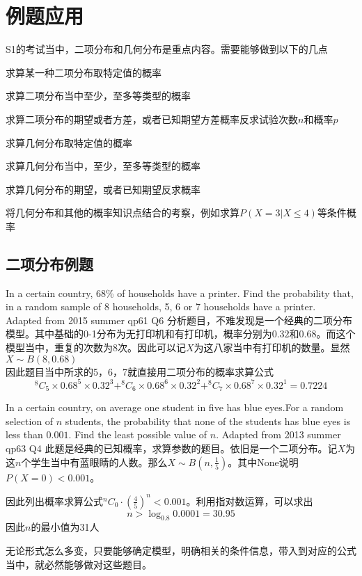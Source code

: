 \clearpage

\section{例题应用}
S1的考试当中，二项分布和几何分布是重点内容。需要能够做到以下的几点
\begin{todolist}
	\item 求算某一种二项分布取特定值的概率
	\item 求算二项分布当中至少，至多等类型的概率
	\item 求算二项分布的期望或者方差，或者已知期望方差概率反求试验次数$n$和概率$p$
	\item 求算几何分布取特定值的概率
	\item 求算几何分布当中，至少，至多等类型的概率
	\item 求算几何分布的期望，或者已知期望反求概率
	\item 将几何分布和其他的概率知识点结合的考察，例如求算$P(X=3|X\leqslant4)$等条件概率
\end{todolist}

\subsection*{二项分布例题}
\begin{ExampleBox}
In a certain country, 68\% of households have a printer. Find the probability that, in a random sample of 8 households, 5, 6 or 7 households have a printer.\\
\makebox{}\hfill Adapted from 2015 summer qp61 Q6
\tcblower
分析题目，不难发现是一个经典的二项分布模型。其中基础的0-1分布为无打印机和有打印机，概率分别为$0.32$和$0.68$。而这个模型当中，重复的次数为$8$次。因此可以记$X$为这八家当中有打印机的数量。显然$X\sim B(8,0.68)$\\

因此题目当中所求的5，6，7就直接用二项分布的概率求算公式
\[
	^8C_5 \times 0.68^5 \times 0.32^3+^8C_6 \times 0.68^6 \times 0.32^2+^8C_7 \times 0.68^7 \times 0.32^1 = 0.7224
\]
\end{ExampleBox}
\clearpage

\begin{ExampleBox}
In a certain country, on average one student in ﬁve has blue eyes.For a random selection of $n$ students, the probability that none of the students has blue eyes is less than $0.001$. Find the least possible value of $n$.
\makebox{}\hfill Adapted from 2013 summer qp63 Q4
\tcblower
此题是经典的已知概率，求算参数的题目。依旧是一个二项分布。记$X$为这$n$个学生当中有蓝眼睛的人数。那么$X\sim B(n,\frac{1}{5})$。其中None说明$P(X=0)<0.001$。

因此列出概率求算公式$^nC_0 \cdot(\frac{4}{5})^n < 0.001$。利用指对数运算，可以求出
\[
	n>\log_{0.8} 0.0001 = 30.95
\]
因此$n$的最小值为31人
\end{ExampleBox}
无论形式怎么多变，只要能够确定模型，明确相关的条件信息，带入到对应的公式当中，就必然能够做对这些题目。



